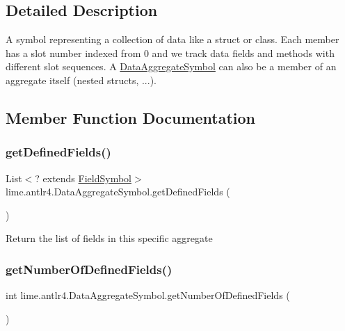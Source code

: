 \subsection{Detailed Description}
A symbol representing a collection of data like a struct or class. Each member has a slot number indexed from 0 and we track data fields and methods with different slot sequences. A \hyperlink{classlime_1_1antlr4_1_1DataAggregateSymbol}{Data\+Aggregate\+Symbol} can also be a member of an aggregate itself (nested structs, ...). 

\subsection{Member Function Documentation}
\mbox{\label{classlime_1_1antlr4_1_1DataAggregateSymbol_abbb99b03010fbdccae19b976e79c468a}} 
\subsubsection{\texorpdfstring{get\+Defined\+Fields()}{getDefinedFields()}}
{\footnotesize\ttfamily List$<$? extends \hyperlink{classlime_1_1antlr4_1_1FieldSymbol}{Field\+Symbol}$>$ lime.\+antlr4.\+Data\+Aggregate\+Symbol.\+get\+Defined\+Fields (\begin{DoxyParamCaption}{ }\end{DoxyParamCaption})}

Return the list of fields in this specific aggregate \mbox{\label{classlime_1_1antlr4_1_1DataAggregateSymbol_a80cf20fc8ae60730946f7dc2f1ab4a41}} 
\subsubsection{\texorpdfstring{get\+Number\+Of\+Defined\+Fields()}{getNumberOfDefinedFields()}}
{\footnotesize\ttfamily int lime.\+antlr4.\+Data\+Aggregate\+Symbol.\+get\+Number\+Of\+Defined\+Fields (\begin{DoxyParamCaption}{ }\end{DoxyParamCaption})}


